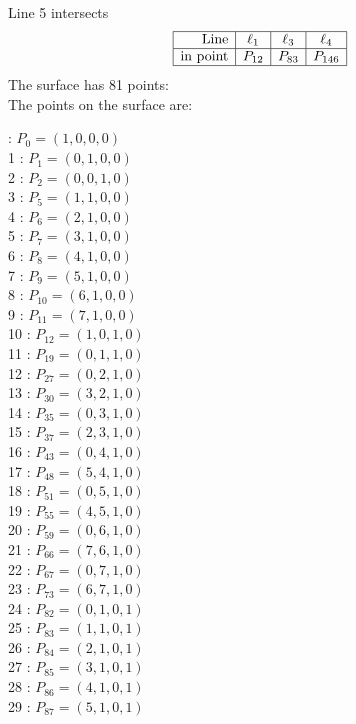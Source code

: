 \documentclass{article}
\begin{document}
{$$$$
Line 5 intersects 
$$
\begin{array}{|r*{3}{|c}|}
\hline
\mbox{Line}  & \ell_{1} & \ell_{3} & \ell_{4}\\
\hline
\mbox{in point}  & P_{12} & P_{83} & P_{146}\\
\hline
\end{array}
$$
The surface has 81 points:\\
The points on the surface are:\\
\begin{multicols}{3}
 : $P_{0}=( 1, 0, 0, 0 )$\\
1 : $P_{1}=( 0, 1, 0, 0 )$\\
2 : $P_{2}=( 0, 0, 1, 0 )$\\
3 : $P_{5}=( 1, 1, 0, 0 )$\\
4 : $P_{6}=( 2, 1, 0, 0 )$\\
5 : $P_{7}=( 3, 1, 0, 0 )$\\
6 : $P_{8}=( 4, 1, 0, 0 )$\\
7 : $P_{9}=( 5, 1, 0, 0 )$\\
8 : $P_{10}=( 6, 1, 0, 0 )$\\
9 : $P_{11}=( 7, 1, 0, 0 )$\\
10 : $P_{12}=( 1, 0, 1, 0 )$\\
11 : $P_{19}=( 0, 1, 1, 0 )$\\
12 : $P_{27}=( 0, 2, 1, 0 )$\\
13 : $P_{30}=( 3, 2, 1, 0 )$\\
14 : $P_{35}=( 0, 3, 1, 0 )$\\
15 : $P_{37}=( 2, 3, 1, 0 )$\\
16 : $P_{43}=( 0, 4, 1, 0 )$\\
17 : $P_{48}=( 5, 4, 1, 0 )$\\
18 : $P_{51}=( 0, 5, 1, 0 )$\\
19 : $P_{55}=( 4, 5, 1, 0 )$\\
20 : $P_{59}=( 0, 6, 1, 0 )$\\
21 : $P_{66}=( 7, 6, 1, 0 )$\\
22 : $P_{67}=( 0, 7, 1, 0 )$\\
23 : $P_{73}=( 6, 7, 1, 0 )$\\
24 : $P_{82}=( 0, 1, 0, 1 )$\\
25 : $P_{83}=( 1, 1, 0, 1 )$\\
26 : $P_{84}=( 2, 1, 0, 1 )$\\
27 : $P_{85}=( 3, 1, 0, 1 )$\\
28 : $P_{86}=( 4, 1, 0, 1 )$\\
29 : $P_{87}=( 5, 1, 0, 1 )$\\

\end{multicols}}
\end{document}
